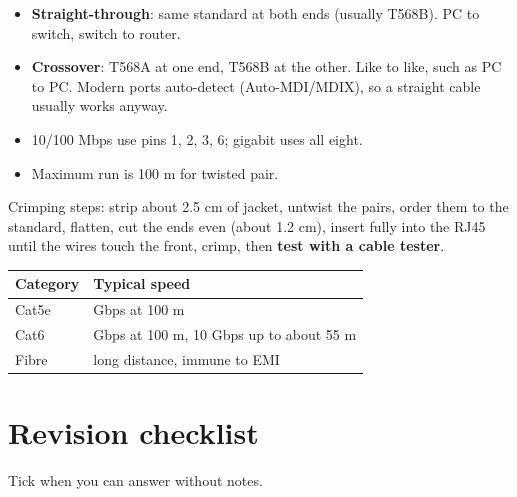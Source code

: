 \documentclass[11pt,a4paper]{article}
\begin{document}
\begin{itemize}
\item \textbf{Straight-through}: same standard at both ends (usually T568B). PC to switch, switch to router.
\item \textbf{Crossover}: T568A at one end, T568B at the other. Like to like, such as PC to PC. Modern ports auto-detect (Auto-MDI/MDIX), so a straight cable usually works anyway.
\item 10/100 Mbps use pins 1, 2, 3, 6; gigabit uses all eight.
\item Maximum run is 100 m for twisted pair.
\end{itemize}
Crimping steps: strip about 2.5 cm of jacket, untwist the pairs, order them to the standard, flatten, cut the ends even (about 1.2 cm), insert fully into the RJ45 until the wires touch the front, crimp, then \textbf{test with a cable tester}.

\begin{center}\small\renewcommand{\arraystretch}{1.18}\setlength{\tabcolsep}{9pt}
\begin{tabularx}{\linewidth}{@{}l>{\raggedright\arraybackslash}X@{}}
\toprule
\textbf{\color{slate}Category} & \textbf{\color{slate}Typical speed} \\ \midrule
Cat5e & 1 Gbps at 100 m \\
Cat6 & 1 Gbps at 100 m, 10 Gbps up to about 55 m \\
Fibre & long distance, immune to EMI \\
\bottomrule
\end{tabularx}\end{center}
\clearpage
\section{Revision checklist}
Tick when you can answer without notes.
\end{document}
